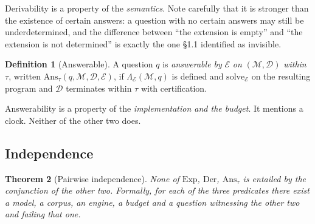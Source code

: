 \documentclass[11pt,a4paper]{article}
\theoremstyle{plain}
\newtheorem{theorem}{Theorem}[section]
\theoremstyle{definition}
\newtheorem{definition}[theorem]{Definition}
\theoremstyle{remark}
\newcommand{\Model}{\mathcal{M}}          %
\newcommand{\Corpus}{\mathcal{D}}         %
\newcommand{\Engine}{\mathcal{E}}         %
\newcommand{\lowr}{\Lambda}               %
\newcommand{\qq}{q}
\begin{document}
Derivability is a property of the \emph{semantics}. Note carefully that it is
stronger than the existence of certain answers: a question with no certain
answers may still be underdetermined, and the difference between ``the
extension is empty'' and ``the extension is not determined'' is exactly the
one \S1.1 identified as invisible.

\begin{definition}[Answerable]
\label{def:answerable}
A question $\qq$ is \emph{answerable by} $\Engine$ \emph{on}
$(\Model, \Corpus)$ \emph{within} $\tau$, written
$\mathrm{Ans}_\tau(\qq, \Model, \Corpus, \Engine)$, if $\lowr_\Engine(\Model, \qq)$
is defined and $\mathrm{solve}_\Engine$ on the resulting program and $\Corpus$
terminates within $\tau$ with certification.
\end{definition}

Answerability is a property of the \emph{implementation and the budget}. It
mentions a clock. Neither of the other two does.

\subsection{Independence}

\begin{theorem}[Pairwise independence]
\label{thm:independence}
None of $\mathrm{Exp}$, $\mathrm{Der}$, $\mathrm{Ans}_\tau$ is entailed by the
conjunction of the other two. Formally, for each of the three predicates there
exist a model, a corpus, an engine, a budget and a question witnessing the
other two and failing that one.
\end{theorem}
\end{document}
